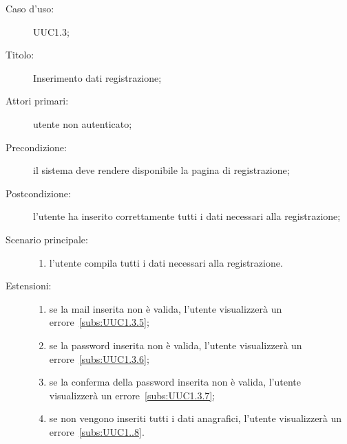 \documentclass[../../../analisi-dei-requisiti.tex]{subfiles}
\begin{document}
\begin{description}
  \item[Caso d’uso:] UUC1.3;
  \item[Titolo:] Inserimento dati registrazione;
  \item[Attori primari:] utente non autenticato;
  \item[Precondizione:] il sistema deve rendere disponibile la pagina di registrazione;
  \item[Postcondizione:] l'utente ha inserito correttamente tutti i dati necessari alla registrazione;
  \item[Scenario principale:]
        \begin{enumerate}
          \item l'utente compila tutti i dati necessari alla registrazione.
        \end{enumerate}
  \item[Estensioni:]
        \begin{enumerate}
          \item se la mail inserita non è valida, l'utente visualizzerà un errore~\ref{subs:UUC1.3.5};
          \item se la password inserita non è valida, l'utente visualizzerà un errore~\ref{subs:UUC1.3.6};
          \item se la conferma della password inserita non è valida, l'utente visualizzerà un errore~\ref{subs:UUC1.3.7};
          \item se non vengono inseriti tutti i dati anagrafici, l'utente visualizzerà un errore~\ref{subs:UUC1..8}.
        \end{enumerate}
\end{description}
\end{document}
